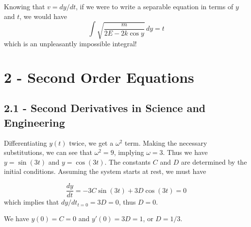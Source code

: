 \documentclass[a4paper]{article}
\begin{document}
Knowing that \(v = dy/dt\), if we were to write a separable equation in terms of \(y\) and \(t\), we would have
\[
	\int \sqrt{\frac{m}{2E - 2k \cos y}} \, dy = t
\]
which is an unpleasantly impossible integral!

\newpage
\section{\textsf{2 - Second Order Equations}}

\subsection{\textsf{2.1 - Second Derivatives in Science and Engineering}}


Differentiating \(y \!\left( t \right) \) twice, we get a \(\omega^{2}\) term. Making the necessary substitutions, we can see that \(\omega^{2} = 9\), implying \(\omega = 3\). Thus we have \(y = \sin\left( 3t \right)\) and \(y = \cos\left( 3t \right)\). The constants \(C\) and \(D\) are determined by the initial conditions. Assuming the system starts at rest, we must have

\[
	\frac{d y}{d t} = - 3C \sin\left( 3t \right) + 3D \cos\left( 3t \right) = 0
\]
which implies that \(dy / dt_{t = 0} = 3D = 0\), thus \(D = 0\).

\vspace{12pt}


We have \(y \!\left( 0 \right) = C = 0\) and \(y' \!\left( 0 \right) = 3D = 1\), or \(D = 1/3\).

\newpage

\end{document}

